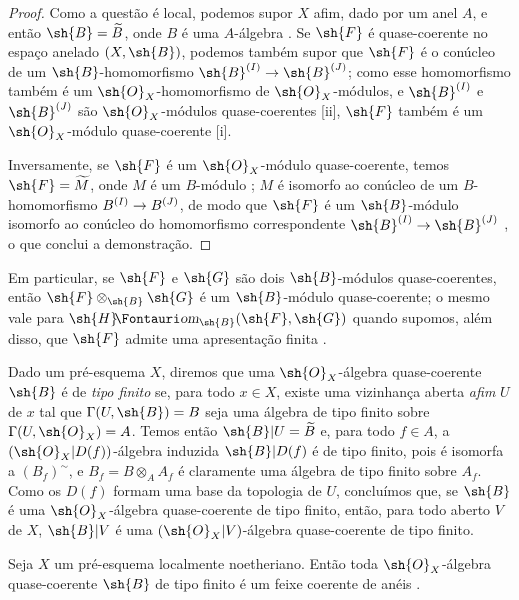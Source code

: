 \documentclass[oneside]{amsart}
\makeatletter
\newcommand{\ega@arrow}[2]{\mathchoice{#1}{#2}{#2}{#2}}
\renewcommand{\to}{\ega@arrow{\longrightarrow}{\rightarrow}}
\newcommand*{\ega@sheafop}[3]{\sh{#1}#2\textup{\kern-2.2pt{\Fontauri\slshape #3}}}
\newcommand*{\shHom}{\ega@sheafop{H}{}{om}}
\let\EGAOriginalLabel\label
\renewcommand{\label}[1]{\phantomsection\EGAOriginalLabel{#1}}
\makeatother
\begin{document}
\begin{proof}
Como a questão é local, podemos supor $X$ afim, dado por um anel $A$, e então $\sh{B}=\widetilde{B}$, onde $B$ é uma $A$-álgebra .
Se $\sh{F}$ é quase-coerente no espaço anelado $(X,\sh{B})$, podemos também supor que $\sh{F}$ é o conúcleo de um $\sh{B}$-homomorfismo $\sh{B}^{(I)}\to\sh{B}^{(J)}$; como esse homomorfismo também é um $\sh{O}_X$-homomorfismo de $\sh{O}_X$-módulos, e $\sh{B}^{(I)}$ e $\sh{B}^{(J)}$ são $\sh{O}_X$-módulos quase-coerentes [ii], $\sh{F}$ também é um $\sh{O}_X$-módulo quase-coerente [i].

Inversamente, se $\sh{F}$ é um $\sh{O}_X$-módulo quase-coerente, temos $\sh{F}=\widetilde{M}$, onde $M$ é um $B$-módulo ; $M$ é isomorfo ao conúcleo de um $B$-homomorfismo $B^{(I)}\to B^{(J)}$, de modo que $\sh{F}$ é um $\sh{B}$-módulo isomorfo ao conúcleo do homomorfismo correspondente $\sh{B}^{(I)}\to\sh{B}^{(J)}$ , o que conclui a demonstração.
\end{proof}

Em particular, se $\sh{F}$ e $\sh{G}$ são dois $\sh{B}$-módulos quase-coerentes, então $\sh{F}\otimes_{\sh{B}}\sh{G}$ é um $\sh{B}$-módulo quase-coerente; o mesmo vale para $\shHom_{\sh{B}}(\sh{F},\sh{G})$ quando supomos, além disso, que $\sh{F}$ admite uma apresentação finita .

\begin{env}[9.6.2]
\label{I.9.6.2}
Dado um pré-esquema $X$, diremos que uma $\sh{O}_X$-álgebra quase-coerente $\sh{B}$ é de \emph{tipo finito} se, para todo $x\in X$, existe uma vizinhança aberta \emph{afim} $U$ de $x$ tal que $\Gamma(U,\sh{B})=B$ seja uma álgebra de tipo finito sobre $\Gamma(U,\sh{O}_X)=A$.
Temos então $\sh{B}|U=\widetilde{B}$ e, para todo $f\in A$, a $(\sh{O}_X|D(f))$-álgebra induzida $\sh{B}|D(f)$ é de tipo finito, pois é isomorfa a $(B_f)^{\sim}$, e $B_f=B\otimes_A A_f$ é claramente uma álgebra de tipo finito sobre $A_f$.
Como os $D(f)$ formam uma base da topologia de $U$, concluímos que, se $\sh{B}$ é uma $\sh{O}_X$-álgebra quase-coerente de tipo finito, então, para todo aberto $V$ de $X$, $\sh{B}|V$ é uma $(\sh{O}_X|V)$-álgebra quase-coerente de tipo finito.
\end{env}

\begin{proposition}[9.6.3]
\label{I.9.6.3}
Seja $X$ um pré-esquema localmente noetheriano.
Então toda $\sh{O}_X$-álgebra quase-coerente $\sh{B}$ de tipo finito é um feixe coerente de anéis .
\end{proposition}
\end{document}
